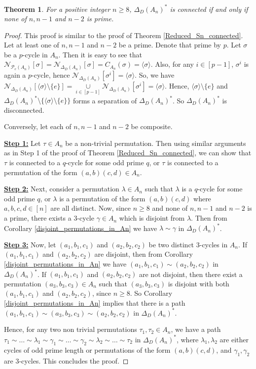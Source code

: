 \documentclass[12pt,a4paper]{article}
\newtheorem{theorem}{Theorem}[section]
\begin{document}
\begin{theorem}\label{Reduced_An_connected}
For a positive integer $n\geq 8$, $\Delta_D(A_n)^*$ is connected if and only if none of $n,n-1$ and $n-2$ is prime.  
\end{theorem}
\begin{proof}
This proof is similar to the proof of Theorem \ref{Reduced_Sn_connected}. Let at least one of $n, n-1$ and $n-2$ be a prime. Denote that prime by $p$. Let $\sigma$ be a $p$-cycle in $A_n$. Then it is easy to see that $\mathcal{N}_{\mathcal{P}_e(A_n)}[\sigma]=\mathcal{N}_{\Delta_D(A_n)}[\sigma]=C_{A_n}(\sigma)=\langle\sigma\rangle$. Also, for any $i\in[p-1]$, $\sigma^i$ is again a $p$-cycle, hence $\mathcal{N}_{\Delta_D(A_n)}[\sigma^i]=\langle\sigma\rangle$. So, we have $\mathcal{N}_{\Delta_D(A_n)}[\langle\sigma\rangle\setminus \{e\}]=\underset{i\in[p-1]}{\cup}\mathcal{N}_{\Delta_D(A_n)}[\sigma^i]=\langle\sigma\rangle$. Hence, $\langle\sigma\rangle\setminus \{e\}$ and $\Delta_D(A_n)^*\setminus\{\langle\sigma\rangle\setminus \{e\}\}$ forms a separation of $\Delta_D(A_n)^*$. So $\Delta_D(A_n)^*$ is disconnected. 

Conversely, let each of $n, n-1$ and $n-2$ be composite.

\noindent\underline{\bf{Step 1:}} Let $\tau\in A_n$ be a non-trivial permutation. Then using similar arguments as in Step 1 of the proof of Theorem \ref{Reduced_Sn_connected}, we can show that $\tau$ is connected to a $q$-cycle for some odd prime $q$, or $\tau$ is connected to a permutation of the form $(a,b)(c,d)\in A_n$.

\noindent\underline{\bf{Step 2:}} Next, consider a permutation $\lambda\in A_n$ such that $\lambda$ is a $q$-cycle for some odd prime $q$, or $\lambda$ is a permutation of the form $(a,b)(c,d)$ where $a,b,c,d\in[n]$ are all distinct. Now, since $n\geq 8$ and none of $n,n-1$ and $n-2$ is a prime, there exists a $3$-cycle $\gamma\in A_n$ which is disjoint from $\lambda$. Then from Corollary \ref{disjoint_permutations_in_An} we have $\lambda\sim\gamma$ in $\Delta_D(A_n)^*$. 

\noindent\underline{\bf{Step 3:}} Now, let $(a_1,b_1,c_1)$ and $(a_2,b_2,c_2)$ be two distinct $3$-cycles in $A_n$. If $(a_1,b_1,c_1)$ and $(a_2,b_2,c_2)$ are disjoint, then from Corollary \ref{disjoint_permutations_in_An} we have $(a_1,b_1,c_1)\sim (a_2,b_2,c_2)$ in $\Delta_D(A_n)^*$. If $(a_1,b_1,c_1)$ and $(a_2,b_2,c_2)$ are not disjoint, then there exist a permutation $(a_3,b_3,c_3)\in A_n$ such that $(a_3,b_3,c_3)$ is disjoint with both $(a_1,b_1,c_1)$ and $(a_2,b_2,c_2)$, since $n\geq 8$. So Corollary \ref{disjoint_permutations_in_An} implies that there is a path $(a_1,b_1,c_1)\sim(a_3,b_3,c_3)\sim(a_2,b_2,c_2)$ in $\Delta_D(A_n)^*$.

Hence, for any two non trivial permutations $\tau_1, \tau_2\in A_n$, we have a path $\tau_1\sim\dots\sim\lambda_1\sim\gamma_1\sim\dots\sim\gamma_2\sim\lambda_2\sim\dots\sim\tau_2$ in $\Delta_D(A_n)^*$, where $\lambda_1,\lambda_2$ are either cycles of odd prime length or permutations of the form $(a,b)(c,d)$, and $\gamma_1,\gamma_2$ are $3$-cycles. This concludes the proof.   
\end{proof}
\end{document}
